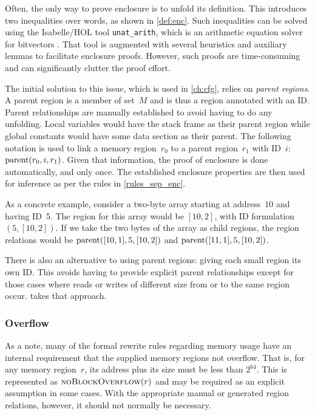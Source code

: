 Often, the only way to prove enclosure is to unfold its definition.
This introduces two inequalities over words, as shown in \cref{def:enc}.
Such inequalities can be solved using the Isabelle/HOL tool \lstinline{unat_arith}, which is an arithmetic equation solver for bitvectors \autocite{dawson2009isabelle,isabelle-word-session}.
That tool is augmented with several heuristics
and auxiliary lemmas to facilitate enclosure proofs.
However, such proofs are time-consuming
and can significantly clutter the proof effort.

The initial solution to this issue, which is used in \cref{ch:cfg},
relies on \emph{parent regions}.%
A parent region is a member of set~$M$ and is thus a region annotated with an ID.
Parent relationships are manually established to avoid having to do any unfolding.
Local variables would have the stack frame as their parent region
while global constants would have some data section as their parent.
The following notation is used to link a memory region~$r_0$
to a parent region~$r_1$ with ID~$i$: $\operatorname{parent}(r_0,i,r_1)$.
Given that information, the proof of enclosure is done automatically, and only once.
The established enclosure properties are then used for inference
as per the rules in \cref{rules_sep_enc}.

As a concrete example, consider a two-byte array starting at address~$10$
and having ID~$5$.
The region for this array would be $[10, 2]$, with ID formulation $(5, [10, 2])$.
If we take the two bytes of the array as child regions,
the region relations would be $\operatorname{parent}([10, 1],5,[10, 2])$
and $\operatorname{parent}([11, 1],5,[10, 2])$.

There is also an alternative to using parent regions:
giving each small region its own ID.
This avoids having to provide explicit parent relationships
except for those cases where reads or writes of different size
from or to the same region occur.  takes that approach.

\subsubsection{Overflow}
As a note, many of the formal rewrite rules regarding memory usage
have an internal requirement that the supplied memory regions not overflow.
That is, for any memory region~$r$,
its address plus its size must be less than $2^{64}$.
This is represented as $\operatorname{\textsc{noBlockOverflow}}(r)$ and may be required as an explicit assumption
in some cases. With the appropriate manual or generated region relations,
however, it should not normally be necessary.

